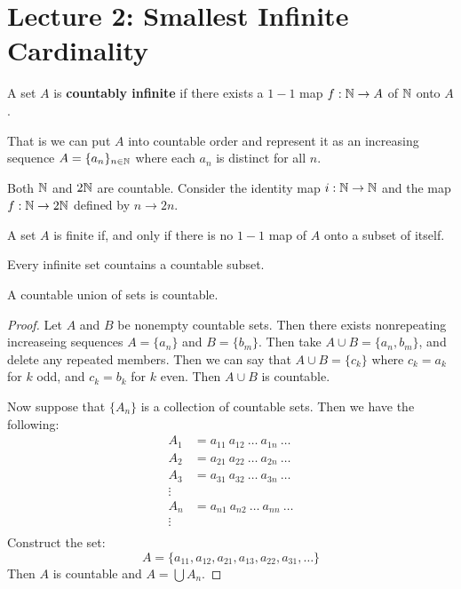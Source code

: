 \section*{Lecture 2: Smallest Infinite Cardinality}

\begin{definition}
    A set $A$ is  \textbf{countably infinite} if there exists a $1-1$ map $f:\mathbb{N}
    \rightarrow A$ of $\mathbb{N}$ onto  $A$.
\end{definition}
\begin{remark}
    That is we can put $A$ into countable order and represent it as an
    increasing sequence $A=\{a_n\}_{n \in \mathbb{N}}$ where each $a_n$ is distinct for
    all  $n$.
\end{remark}

\begin{example}\label{}
    Both $\mathbb{N}$ and  $2\mathbb{N}$ are countable. Consider the identity map  $i:\mathbb{N}
    \rightarrow \mathbb{N}$ and the map $f:\mathbb{N} \rightarrow 2\mathbb{N}$ defined by $n \rightarrow
    2n$.
\end{example}

\begin{theorem}\label{thm_2.1}
    A set $A$ is finite if, and only if there is no  $1-1$ map of $A$ onto a
    subset of itself.
\end{theorem}
\begin{corollary}
    Every infinite set countains a countable subset.
\end{corollary}

\begin{theorem}\label{}
    A countable union of sets is countable.
\end{theorem}
\begin{proof}
    Let $A$ and  $B$ be nonempty countable sets. Then there exists nonrepeating
    increaseing sequences  $A=\{a_n\}$ and $B=\{b_m\}$. Then take $A \cup
    B=\{a_n,b_m\}$, and delete any repeated members. Then we can say that $A
    \cup B=\{c_k\}$ where $c_k=a_k$ for  $k$ odd, and  $c_k=b_k$ for  $k$ even.
    Then  $A \cup B$ is countable.

    Now suppose that  $\{A_n\}$ is a collection of countable sets. Then we have
    the following:
    \begin{align*}
        A_1     &=      a_{11} \ a_{12} \ \dots \ a_{1n} \ \dots \\
        A_2     &=      a_{21} \ a_{22} \ \dots \ a_{2n} \ \dots \\
        A_3     &=      a_{31} \ a_{32} \ \dots \ a_{3n} \ \dots \\
                \vdots                              \\
        A_n     &=      a_{n1} \ a_{n2} \ \dots \ a_{nn} \ \dots \\
                \vdots                                \\
    \end{align*}
    Construct the set:
    \begin{equation*}
        A=\{a_{11},a_{12},a_{21},a_{13},a_{22},a_{31}, \dots\}
    \end{equation*}
    Then $A$ is countable and $A=\bigcup{A_n}$.
\end{proof}

